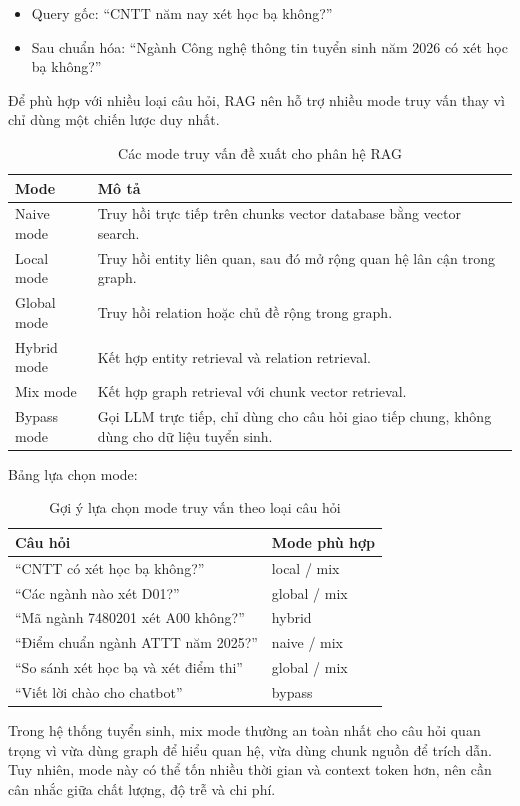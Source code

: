 \begin{itemize}
    \item Query gốc: ``CNTT năm nay xét học bạ không?''
    \item Sau chuẩn hóa: ``Ngành Công nghệ thông tin tuyển sinh năm 2026 có xét học bạ không?''
\end{itemize}

Để phù hợp với nhiều loại câu hỏi, RAG nên hỗ trợ nhiều mode truy vấn thay vì chỉ dùng một chiến lược duy nhất.

\begin{table}[H]
\centering
\begin{tabular}{|p{3.2cm}|p{9.6cm}|}
\hline
\textbf{Mode} & \textbf{Mô tả} \\
\hline
Naive mode & Truy hồi trực tiếp trên chunks vector database bằng vector search. \\
\hline
Local mode & Truy hồi entity liên quan, sau đó mở rộng quan hệ lân cận trong graph. \\
\hline
Global mode & Truy hồi relation hoặc chủ đề rộng trong graph. \\
\hline
Hybrid mode & Kết hợp entity retrieval và relation retrieval. \\
\hline
Mix mode & Kết hợp graph retrieval với chunk vector retrieval. \\
\hline
Bypass mode & Gọi LLM trực tiếp, chỉ dùng cho câu hỏi giao tiếp chung, không dùng cho dữ liệu tuyển sinh. \\
\hline
\end{tabular}
\caption{Các mode truy vấn đề xuất cho phân hệ RAG}
\label{tab:rag-query-modes}
\end{table}

Bảng lựa chọn mode:

\begin{table}[H]
\centering
\begin{tabular}{|p{6cm}|p{6.8cm}|}
\hline
\textbf{Câu hỏi} & \textbf{Mode phù hợp} \\
\hline
``CNTT có xét học bạ không?'' & local / mix \\
\hline
``Các ngành nào xét D01?'' & global / mix \\
\hline
``Mã ngành 7480201 xét A00 không?'' & hybrid \\
\hline
``Điểm chuẩn ngành ATTT năm 2025?'' & naive / mix \\
\hline
``So sánh xét học bạ và xét điểm thi'' & global / mix \\
\hline
``Viết lời chào cho chatbot'' & bypass \\
\hline
\end{tabular}
\caption{Gợi ý lựa chọn mode truy vấn theo loại câu hỏi}
\label{tab:rag-mode-selection}
\end{table}

Trong hệ thống tuyển sinh, mix mode thường an toàn nhất cho câu hỏi quan trọng vì vừa dùng graph để hiểu quan hệ, vừa dùng chunk nguồn để trích dẫn. Tuy nhiên, mode này có thể tốn nhiều thời gian và context token hơn, nên cần cân nhắc giữa chất lượng, độ trễ và chi phí.
